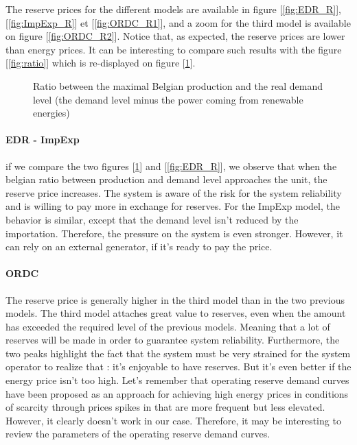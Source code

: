 
The reserve prices for the different models are available in figure [\ref{fig:EDR_R}], [\ref{fig:ImpExp_R}] et [\ref{fig:ORDC_R1}], and a zoom for the third model  is available on figure [\ref{fig:ORDC_R2}]. Notice that, as expected, the reserve prices are lower than energy prices. It can be interesting to  compare such results with the figure [\ref{fig:ratio}] which is re-displayed on figure [\ref{fig:ratio2}].

\begin{figure}[H]
    \centering
    \setlength\fheight{4cm}
    \setlength{}
    
    \caption{Ratio between the maximal Belgian production and the real demand level (the demand level minus the power coming from renewable energies)}
    \label{fig:ratio2}
\end{figure}

\paragraph{EDR - ImpExp} if we compare the two figures [\ref{fig:ratio2}] and [\ref{fig:EDR_R}], we observe that when the belgian ratio between production and demand level approaches the unit, the reserve price increases. The system is aware of the risk for the system reliability and is willing to pay more in exchange for reserves. For the ImpExp model, the behavior is similar, except that the demand level isn't reduced by the importation. Therefore, the pressure on the system is even stronger. However, it can rely on an external generator, if it's ready to pay the price.

\paragraph{ORDC} The reserve price is generally higher in the third model than in the two previous models. The third model attaches great value to reserves, even when the amount has exceeded the required level of the previous models. Meaning that a lot of reserves will be made in order to guarantee system reliability. Furthermore, the two peaks highlight the fact that the system must be very strained for the system operator to realize that : it's enjoyable to have reserves. But it's even better if the energy price isn't too high. Let's remember that operating reserve demand curves have been proposed as an approach for achieving high energy prices in conditions of scarcity through prices spikes in that are more frequent but less elevated. However, it clearly doesn't work in our case. Therefore, it may be interesting to review the parameters of the operating reserve demand curves. 

